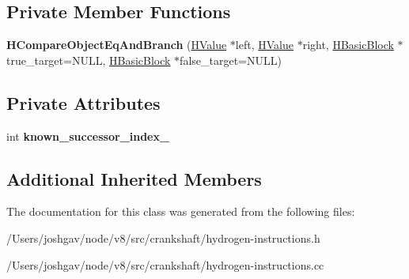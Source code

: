 \subsection*{Private Member Functions}
\begin{DoxyCompactItemize}
\item 
{\bfseries H\+Compare\+Object\+Eq\+And\+Branch} (\hyperlink{classv8_1_1internal_1_1_h_value}{H\+Value} $\ast$left, \hyperlink{classv8_1_1internal_1_1_h_value}{H\+Value} $\ast$right, \hyperlink{classv8_1_1internal_1_1_h_basic_block}{H\+Basic\+Block} $\ast$true\+\_\+target=N\+U\+LL, \hyperlink{classv8_1_1internal_1_1_h_basic_block}{H\+Basic\+Block} $\ast$false\+\_\+target=N\+U\+LL)\hypertarget{classv8_1_1internal_1_1_h_compare_object_eq_and_branch_a0013f4456a66f8ffa4af8e0c392cde02}{}\label{classv8_1_1internal_1_1_h_compare_object_eq_and_branch_a0013f4456a66f8ffa4af8e0c392cde02}

\end{DoxyCompactItemize}
\subsection*{Private Attributes}
\begin{DoxyCompactItemize}
\item 
int {\bfseries known\+\_\+successor\+\_\+index\+\_\+}\hypertarget{classv8_1_1internal_1_1_h_compare_object_eq_and_branch_aceb570809b8ff33ea38bd5ab68ea9f55}{}\label{classv8_1_1internal_1_1_h_compare_object_eq_and_branch_aceb570809b8ff33ea38bd5ab68ea9f55}

\end{DoxyCompactItemize}
\subsection*{Additional Inherited Members}


The documentation for this class was generated from the following files\+:\begin{DoxyCompactItemize}
\item 
/\+Users/joshgav/node/v8/src/crankshaft/hydrogen-\/instructions.\+h\item 
/\+Users/joshgav/node/v8/src/crankshaft/hydrogen-\/instructions.\+cc\end{DoxyCompactItemize}
